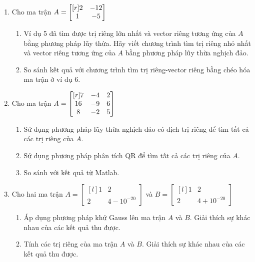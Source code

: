 \begin{enumerate}
	\item Cho ma trận
	$A = \begin{bmatrix}[r]2 & -12 \\ 1 & -5\end{bmatrix}$
	\begin{enumerate}
		\item Ví dụ 5 đã tìm được trị riêng lớn nhất và vector riêng tương ứng của $A$ bằng phương		pháp lũy thừa. Hãy viết chương trình tìm trị riêng nhỏ nhất và vector riêng tương ứng của $A$ bằng phương pháp lũy thừa nghịch đảo.
		\item So sánh kết quả với chương trình tìm trị riêng-vector riêng bằng chéo hóa ma trận ở ví dụ 6.
	\end{enumerate}
	\item Cho ma trận
	$A = \begin{bmatrix}[r]7&-4&2\\16&-9&6\\8&-2&5\end{bmatrix}$
	\begin{enumerate}
		\item Sử dụng phương pháp lũy thừa nghịch đảo có dịch trị riêng để tìm tất cả các trị riêng của $A$.
		\item Sử dụng phương pháp phân tích QR để tìm tất cả các trị riêng của $A$.
		\item So sánh với kết quả từ Matlab.
	\end{enumerate}

	\item Cho hai ma trận 
	$A = \begin{bmatrix}[l]1&2\\2&4-10^{-20}\end{bmatrix}$ và 
	$B = \begin{bmatrix}[l]1&2\\2&4+10^{-20}\end{bmatrix}$
	\begin{enumerate}
		\item Áp dụng phương pháp khử Gauss lên ma trận $A$ và $B$. Giải thích sự khác nhau của các kết quả thu được.
		\item Tính các trị riêng của ma trận $A$ và $B$. Giải thích sự khác nhau của các kết quả thu được.
	\end{enumerate}

	
\end{enumerate}


